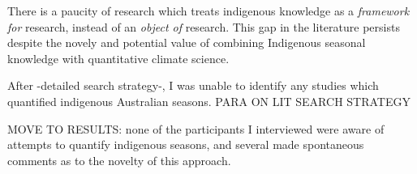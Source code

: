 There is a paucity of research which treats indigenous knowledge
as a \emph{framework for} research, instead of an \emph{object of} research.
This gap in the literature persists despite the novely and potential value
of combining Indigenous seasonal knowledge with quantitative climate science.

After -detailed search strategy-, I was unable to identify any studies which 
quantified indigenous Australian seasons.  PARA ON LIT SEARCH STRATEGY


MOVE TO RESULTS: none of the participants I interviewed were aware of
attempts to quantify indigenous seasons, and several made spontaneous
comments as to the novelty of this approach.





